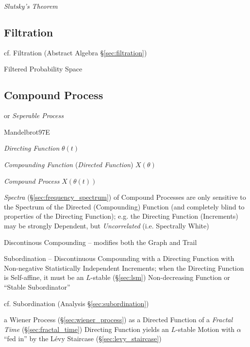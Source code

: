 \emph{Slutsky's Theorem}



\subsection{Filtration}\label{sec:stochastic_filtration}

cf. Filtration (Abstract Algebra \S\ref{sec:filtration})

Filtered Probability Space



\subsection{Compound Process}\label{sec:compound_process}

or \emph{Seperable Process}

Mandelbrot97E

\emph{Directing Function} $\theta(t)$

\emph{Compounding Function} (\emph{Directed Function}) $X(\theta)$

\emph{Compound Process} $X(\theta(t))$


\emph{Spectra} (\S\ref{sec:frequency_spectrum}) of Compound Processes are only
sensitive to the Spectrum of the Directed (Compounding) Function (and completely
blind to properties of the Directing Function); e.g. the Directing Function
(Increments) may be strongly Dependent, but \emph{Uncorrelated} (i.e. Spectrally
White)

Discontinous Compounding -- modifies both the Graph and Trail

Subordination -- Discontinuous Compounding with a Directing Function with
Non-negative Statistically Independent Increments;
when the Directing Function is Self-affine, it must be an $L$-stable
(\S\ref{sec:lsm}) Non-decreasing Function or ``Stable Subordinator''

\fist cf. Subordination (Analysis \S\ref{sec:subordination})

a Wiener Process (\S\ref{sec:wiener_process}) as a Directed Function of a
\emph{Fractal Time} (\S\ref{sec:fractal_time}) Directing Function yields an
$L$-stable Motion with $\alpha$ ``fed in'' by the L\'evy Staircase
(\S\ref{sec:levy_staircase})

